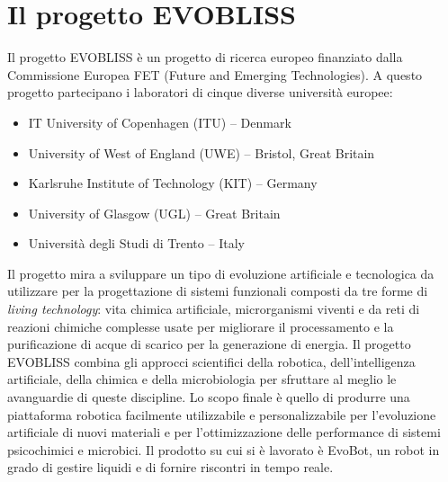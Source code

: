 \section{Il progetto EVOBLISS}
\label{sec:context}
Il progetto EVOBLISS  è un progetto di ricerca europeo finanziato dalla Commissione Europea FET (Future and Emerging Technologies). A questo progetto partecipano i laboratori di cinque diverse università europee:
\begin{itemize}
\item IT University of Copenhagen (ITU) – Denmark
\item University of West of England (UWE) – Bristol, Great Britain
\item Karlsruhe Institute of Technology (KIT) – Germany
\item University of Glasgow (UGL) – Great Britain
\item Università degli Studi di Trento – Italy
\end{itemize}
Il progetto mira a sviluppare un tipo di evoluzione artificiale e tecnologica da utilizzare per la progettazione di sistemi funzionali composti da tre forme di \emph{living technology}: vita chimica artificiale, microrganismi viventi e da reti di reazioni chimiche complesse usate per migliorare il processamento e la purificazione di acque di scarico per la generazione di energia.
Il progetto EVOBLISS combina gli approcci scientifici della robotica, dell'intelligenza artificiale, della chimica e della microbiologia per sfruttare al meglio le avanguardie di queste discipline. Lo scopo finale è quello di produrre una piattaforma robotica facilmente utilizzabile e personalizzabile per l'evoluzione artificiale di nuovi materiali e per l'ottimizzazione delle performance di sistemi psicochimici e microbici. Il prodotto su cui si è lavorato è EvoBot, un robot in grado di gestire liquidi e di fornire riscontri in tempo reale. 

